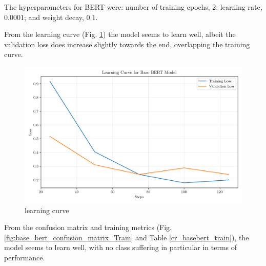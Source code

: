 \documentclass[conference]{IEEEtran}
\begin{document}
The hyperparameters for BERT were: number of training epochs, 2; learning rate, 0.0001; and weight decay, 0.1.







From the learning curve (Fig. \ref{fig:base_bert_learning_curve}) the model seems to learn well, albeit the validation loss does increase slightly towards the end, overlapping the training curve.

\begin{figure}[H]
    \centering
    \includegraphics[width=1\linewidth]{assets/base_bert_learning_curve.png}
    \caption{learning curve}
    \label{fig:base_bert_learning_curve}
\end{figure}

From the confusion matrix and training metrics (Fig. \ref{fig:base_bert_confusion_matrix_Train} and Table \ref{cr_basebert_train}), the model seems to learn well, with no class suffering in particular in terms of performance. 
\end{document}
